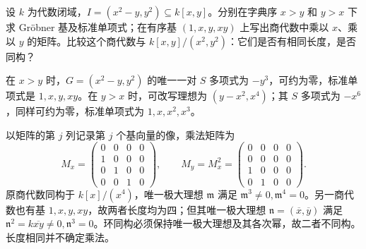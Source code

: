 \begin{exercise}\label{g5:ex:quotient-multiplication}
	设 \(k\) 为代数闭域，\(I=(x^2-y,y^2)\subseteq k[x,y]\)。分别在字典序 \(x>y\) 和 \(y>x\) 下求 Gröbner 基及标准单项式；在有序基 \((1,x,y,xy)\) 上写出商代数中乘以 \(x\)、乘以 \(y\) 的矩阵。比较这个商代数与 \(k[x,y]/(x^2,y^2)\)：它们是否有相同长度，是否同构？
\end{exercise}
\begin{solution}
	在 \(x>y\) 时，\(G=(x^2-y,y^2)\) 的唯一一对 \(S\) 多项式为 \(-y^3\)，可约为零，标准单项式是 \(1,x,y,xy\)。在 \(y>x\) 时，可改写理想为 \((y-x^2,x^4)\)；其 \(S\) 多项式为 \(-x^6\)，同样可约为零，标准单项式为 \(1,x,x^2,x^3\)。

	以矩阵的第 \(j\) 列记录第 \(j\) 个基向量的像，乘法矩阵为
	\[
		M_x=\begin{pmatrix}
			0&0&0&0\\1&0&0&0\\0&1&0&0\\0&0&1&0
		\end{pmatrix},\qquad
		M_y=M_x^2=\begin{pmatrix}
			0&0&0&0\\0&0&0&0\\1&0&0&0\\0&1&0&0
		\end{pmatrix}.
	\]
	原商代数同构于 \(k[x]/(x^4)\)，唯一极大理想 \(\mathfrak m\) 满足 \(\mathfrak m^3\ne0,\mathfrak m^4=0\)。另一商代数也有基 \(1,x,y,xy\)，故两者长度均为四；但其唯一极大理想 \(\mathfrak n=(\overline x,\overline y)\) 满足 \(\mathfrak n^2=k\overline{xy}\ne0,\mathfrak n^3=0\)。环同构必须保持唯一极大理想及其各次幂，故二者不同构。长度相同并不确定乘法。
\end{solution}
